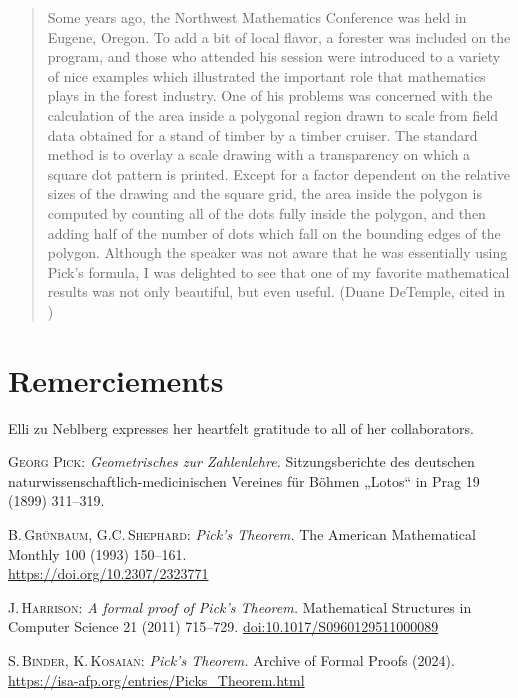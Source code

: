 \documentclass[a4paper]{amsart}
\numberwithin{equation}{section}
\theoremstyle{plain}
\theoremstyle{definition}
\begin{document}
\begin{quote}
  Some years ago, the Northwest Mathematics Conference was held in Eugene,
  Oregon. To add a bit of local flavor, a forester was included on the program,
  and those who attended his session were introduced to a variety of nice
  examples which illustrated the important role that mathematics plays in the
  forest industry. One of his problems was concerned with the calculation of
  the area inside a polygonal region drawn to scale from field data obtained for
  a stand of timber by a timber cruiser. The standard method is to overlay a
  scale drawing with a transparency on which a square dot pattern is printed.
  Except for a factor dependent on the relative sizes of the drawing and the
  square grid, the area inside the polygon is computed by counting all of the
  dots fully inside the polygon, and then adding half of the number of dots
  which fall on the bounding edges of the polygon. Although the speaker was
  not aware that he was essentially using Pick's formula, I was delighted to see
  that one of my favorite mathematical results was not only beautiful, but even
  useful. (Duane DeTemple, cited in \cite{Gruenbaum:Shepard:1993})
\end{quote}


\section*{Remerciements}

Elli zu Neblberg expresses her heartfelt gratitude to all of her collaborators.


\begin{thebibliography}{8}

  \textsc{Georg Pick:} \textit{Geometrisches zur Zahlenlehre.}
  Sitzungsberichte des deutschen naturwissenschaftlich-medicinischen Vereines für Böhmen
  „Lotos“ in Prag 19 (1899) 311--319. %

  \textsc{B.\,Grünbaum, G.C.\,Shephard:} \textit{Pick's Theorem.}
  The American Mathematical Monthly 100 (1993) 150--161.
  \\ \url{https://doi.org/10.2307/2323771}

  \textsc{J.\,Harrison:} \textit{A formal proof of Pick’s Theorem.}
  Mathematical Structures in Computer Science 21 (2011) 715--729.
  \url{doi:10.1017/S0960129511000089}
  
  \textsc{S.\,Binder, K.\,Kosaian:} \textit{Pick's Theorem.}
  Archive of Formal Proofs (2024).
  \\ \url{https://isa-afp.org/entries/Picks_Theorem.html}
  
\end{thebibliography}

\end{document}
